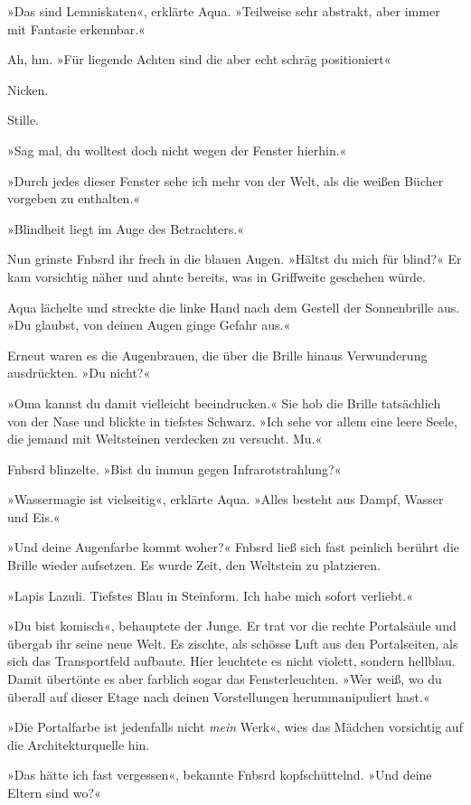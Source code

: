 »Das sind Lemniskaten«, erklärte Aqua. »Teilweise sehr abstrakt, aber immer mit Fantasie erkennbar.«

Ah, hm. »Für liegende Achten sind die aber echt schräg positioniert«

Nicken.

Stille.

»Sag mal, du wolltest doch nicht wegen der Fenster hierhin.«

»Durch jedes dieser Fenster sehe ich mehr von der Welt, als die weißen Bücher vorgeben zu enthalten.«

»Blindheit liegt im Auge des Betrachters.«

Nun grinste Fnbsrd ihr frech in die blauen Augen. »Hältst du mich für blind?« Er kam vorsichtig näher und ahnte bereits, was in Griffweite geschehen würde.

Aqua lächelte und streckte die linke Hand nach dem Gestell der Sonnenbrille aus. »Du glaubst, von deinen Augen ginge Gefahr aus.«

Erneut waren es die Augenbrauen, die über die Brille hinaus Verwunderung ausdrückten. »Du nicht?«

»Oma kannst du damit vielleicht beeindrucken.« Sie hob die Brille tatsächlich von der Nase und blickte in tiefstes Schwarz. »Ich sehe vor allem eine leere Seele, die jemand mit Weltsteinen verdecken zu versucht. Mu.«

Fnbsrd blinzelte. »Bist du immun gegen Infrarotstrahlung?«

»Wassermagie ist vielseitig«, erklärte Aqua. »Alles besteht aus Dampf, Wasser und Eis.«

»Und deine Augenfarbe kommt woher?« Fnbsrd ließ sich fast peinlich berührt die Brille wieder aufsetzen. Es wurde Zeit, den Weltstein zu platzieren.

»Lapis Lazuli. Tiefstes Blau in Steinform. Ich habe mich sofort verliebt.«

»Du bist komisch«, behauptete der Junge. Er trat vor die rechte Portalsäule und übergab ihr seine neue Welt. Es zischte, als schösse Luft aus den Portalseiten, als sich das Transportfeld aufbaute. Hier leuchtete es nicht violett, sondern hellblau. Damit übertönte es aber farblich sogar das Fensterleuchten. »Wer weiß, wo du überall auf dieser Etage nach deinen Vorstellungen herummanipuliert hast.«

»Die Portalfarbe ist jedenfalls nicht \emph{mein} Werk«, wies das Mädchen vorsichtig auf die Architekturquelle hin.

»Das hätte ich fast vergessen«, bekannte Fnbsrd kopfschüttelnd. »Und deine Eltern sind wo?«

